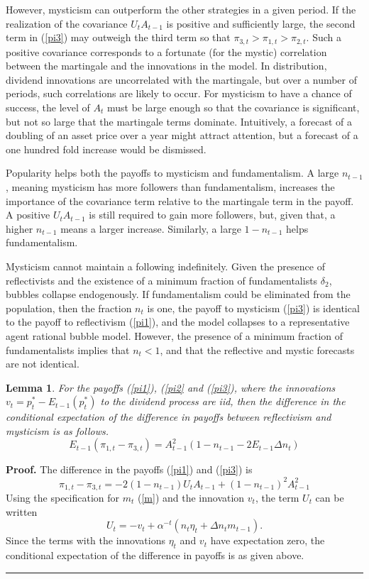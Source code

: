 \documentclass[12pt]{article}
\newenvironment{proof}[1][Proof]{\noindent\textbf{#1.} }{\ \rule{0.5em}{0.5em}}
\newtheorem{lemma}{Lemma}
\begin{document}
However, mysticism can outperform the other strategies in a given period. If the realization of the covariance $U_{t} A_{t-1}$ is positive and sufficiently large, the second term in (\ref{pi3}) may outweigh the third term so that $\pi_{3, t}>\pi_{1, t}>\pi_{2, t}$. Such a positive covariance corresponds to a fortunate (for the mystic) correlation between the martingale and the innovations in the model. In distribution, dividend innovations are uncorrelated with the martingale, but over a number of periods, such correlations are likely to occur. For mysticism to have a chance of success, the level of $A_{t}$ must be large enough so that the covariance is significant, but not so large that the martingale terms dominate. Intuitively, a forecast of a doubling of an asset price over a year might attract attention, but a forecast of a one hundred fold increase would be dismissed.

Popularity helps both the payoffs to mysticism and fundamentalism. A large $n_{t-1}$, meaning mysticism has more followers than fundamentalism, increases the importance of the covariance term relative to the martingale term in the payoff. A positive $U_{t} A_{t-1}$ is still required to gain more followers, but, given that, a higher $n_{t-1}$ means a larger increase. Similarly, a large $1-n_{t-1}$ helps fundamentalism.

Mysticism cannot maintain a following indefinitely. Given the presence of reflectivists and the existence of a minimum fraction of fundamentalists $\delta_{2}$, bubbles collapse endogenously. If fundamentalism could be eliminated from the population, then the fraction $n_{t}$ is one, the payoff to mysticism (\ref{pi3}) is identical to the payoff to reflectivism (\ref{pi1}), and the model collapses to a representative agent rational bubble model. However, the presence of a minimum fraction of fundamentalists implies that $n_{t}<1$, and that the reflective and mystic forecasts are not identical.

\begin{lemma} For the payoffs (\ref{pi1}), (\ref{pi2} and (\ref{pi3}), where the innovations $v_{t}=p_{t}^{*}-E_{t-1}\left(p_{t}^{*}\right)$ to the dividend process are \textit{iid}, then the difference in the conditional expectation of the difference in payoffs between reflectivism and mysticism is as follows.
\[
E_{t-1}\left( \pi_{1, t}-\pi_{3, t}\right)= A_{t-1}^{2}\left(1-n_{t-1}-2E_{t-1}\Delta n_{t}\right)
\]
\end{lemma}
\begin{proof}
The difference in the payoffs (\ref{pi1}) and (\ref{pi3}) is
$$
\pi_{1, t}-\pi_{3, t}=-2\left(1-n_{t-1}\right) U_{t} A_{t-1}+\left(1-n_{t-1}\right)^{2} A_{t-1}^{2}
$$
Using the specification for $m_{t}$ (\ref{m}) and the innovation $v_{t}$, the term $U_{t}$ can be written
\[
U_{t}=-v_{t}+\alpha^{-t}\left(n_{t}\eta_{t}+\Delta n_{t}m_{t-1}\right).
\]
Since the terms with the innovations $\eta_{t}$ and $v_{t}$ have expectation zero, the conditional expectation of the difference in payoffs is as given above.
\end{proof}
\end{document}
